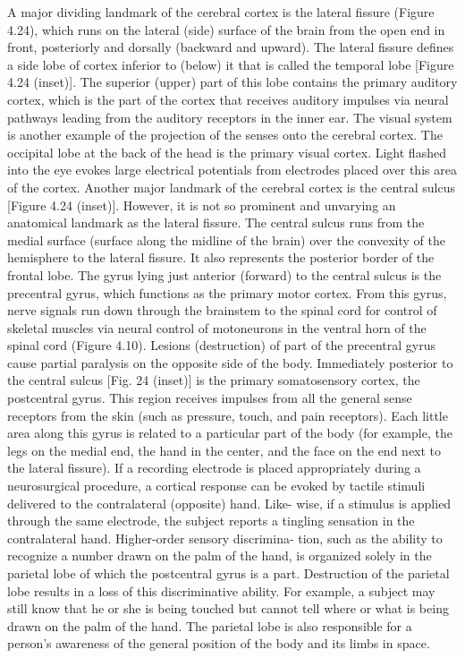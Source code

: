 A major dividing landmark of the cerebral cortex is the lateral fissure
(Figure 4.24), which runs on the lateral (side) surface of the brain from the
open end in front, posteriorly and dorsally (backward and upward). The lateral
fissure defines a side lobe of cortex inferior to (below) it that is called the
temporal lobe [Figure 4.24 (inset)]. The superior (upper) part of this lobe
contains the primary auditory cortex, which is the part of the cortex that
receives auditory impulses via neural pathways leading from the auditory
receptors in the inner ear.
The visual system is another example of the projection of the senses onto
the cerebral cortex. The occipital lobe at the back of the head is the primary
visual cortex. Light flashed into the eye evokes large electrical potentials from
electrodes placed over this area of the cortex.
Another major landmark of the cerebral cortex is the central sulcus
[Figure 4.24 (inset)]. However, it is not so prominent and unvarying an
anatomical landmark as the lateral fissure. The central sulcus runs from
the medial surface (surface along the midline of the brain) over the convexity
of the hemisphere to the lateral fissure. It also represents the posterior border
of the frontal lobe. The gyrus lying just anterior (forward) to the central sulcus
is the precentral gyrus, which functions as the primary motor cortex. From this
gyrus, nerve signals run down through the brainstem to the spinal cord for
control of skeletal muscles via neural control of motoneurons in the ventral
horn of the spinal cord (Figure 4.10). Lesions (destruction) of part of the
precentral gyrus cause partial paralysis on the opposite side of the body.
Immediately posterior to the central sulcus [Fig. 24 (inset)] is the primary
somatosensory cortex, the postcentral gyrus. This region receives impulses from
all the general sense receptors from the skin (such as pressure, touch, and pain
receptors). Each little area along this gyrus is related to a particular part of the
body (for example, the legs on the medial end, the hand in the center, and the
face on the end next to the lateral fissure). If a recording electrode is placed
appropriately during a neurosurgical procedure, a cortical response can be
evoked by tactile stimuli delivered to the contralateral (opposite) hand. Like-
wise, if a stimulus is applied through the same electrode, the subject reports a
tingling sensation in the contralateral hand. Higher-order sensory discrimina-
tion, such as the ability to recognize a number drawn on the palm of the hand,
is organized solely in the parietal lobe of which the postcentral gyrus is a part.
Destruction of the parietal lobe results in a loss of this discriminative ability.
For example, a subject may still know that he or she is being touched but
cannot tell where or what is being drawn on the palm of the hand. The parietal
lobe is also responsible for a person’s awareness of the general position of the
body and its limbs in space.

